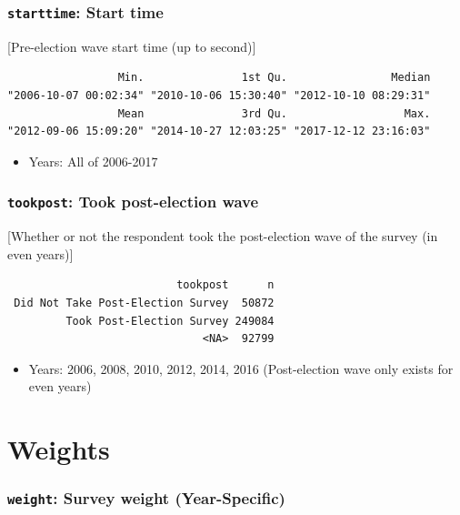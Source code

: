 \documentclass[10pt,article,oneside]{memoir}
\theoremstyle{definition}
\begin{document}
\subsubsection{\texorpdfstring{\texttt{starttime}: Start
time}{starttime: Start time}}\label{starttime-start-time}

{[}Pre-election wave start time (up to second){]}

\begin{verbatim}
                 Min.               1st Qu.                Median 
"2006-10-07 00:02:34" "2010-10-06 15:30:40" "2012-10-10 08:29:31" 
                 Mean               3rd Qu.                  Max. 
"2012-09-06 15:09:20" "2014-10-27 12:03:25" "2017-12-12 23:16:03" 
\end{verbatim}

\begin{itemize}
\tightlist
\item
  Years: All of 2006-2017
\end{itemize}

\subsubsection{\texorpdfstring{\texttt{tookpost}: Took post-election
wave}{tookpost: Took post-election wave}}\label{tookpost-took-post-election-wave}

{[}Whether or not the respondent took the post-election wave of the
survey (in even years){]}

\begin{verbatim}
                          tookpost      n
 Did Not Take Post-Election Survey  50872
         Took Post-Election Survey 249084
                              <NA>  92799
\end{verbatim}

\begin{itemize}
\tightlist
\item
  Years: 2006, 2008, 2010, 2012, 2014, 2016 (Post-election wave only
  exists for even years)
\end{itemize}

\section{Weights}\label{weights}

\subsubsection{\texorpdfstring{\texttt{weight}: Survey weight
(Year-Specific)}{weight: Survey weight (Year-Specific)}}\label{weight-survey-weight-year-specific}
\end{document}

